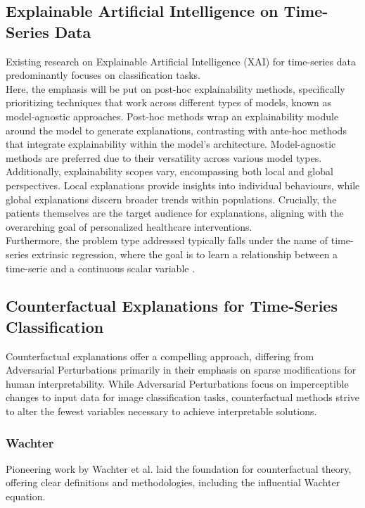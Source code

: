 \subsection{Explainable Artificial Intelligence on Time-Series Data} Existing research on Explainable Artificial Intelligence (XAI) for time-series data predominantly focuses on classification tasks. \\
Here, the emphasis will be put on post-hoc explainability methods, specifically prioritizing techniques that work across different types of models, known as model-agnostic approaches.
Post-hoc methods wrap an explainability module around the model to generate explanations, contrasting with ante-hoc methods that integrate explainability within the model's architecture.
Model-agnostic methods are preferred due to their versatility across various model types. \\
Additionally, explainability scopes vary, encompassing both local and global perspectives.
Local explanations provide insights into individual behaviours, while global explanations discern broader trends within populations.
Crucially, the patients themselves are the target audience for explanations, aligning with the overarching goal of personalized healthcare interventions.\\
Furthermore, the problem type addressed typically falls under the name of time-series extrinsic regression, where the goal is to learn a relationship between a time-serie and a continuous scalar variable \cite{tan_time_2021}.



\subsection{Counterfactual Explanations for Time-Series Classification} Counterfactual explanations offer a compelling approach, differing from Adversarial Perturbations primarily in their emphasis on sparse modifications for human interpretability.
While Adversarial Perturbations focus on imperceptible changes to input data for image classification tasks, counterfactual methods strive to alter the fewest variables necessary to achieve interpretable solutions. \\


\subsubsection{Wachter} Pioneering work by Wachter et al. \cite{wachter_counterfactual_2018} laid the foundation for counterfactual theory, offering clear definitions and methodologies, including the influential Wachter equation.

